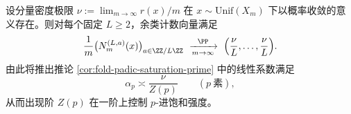\begin{conjecture}[分量余类的渐近等分布与出现阶普适律]\label{conj:fold-component-residue-equidistribution}
设分量密度极限
\(
\nu:=\lim_{m\to\infty} r(x)/m
\)
在 \(x\sim\mathrm{Unif}(X_m)\) 下以概率收敛的意义存在。则对每个固定 \(L\ge 2\)，余类计数向量满足
\[
\frac1m\bigl(N_m^{(L,a)}(x)\bigr)_{a\in\ZZ/L\ZZ}\ \xrightarrow[m\to\infty]{\PP}\ \Bigl(\frac{\nu}{L},\dots,\frac{\nu}{L}\Bigr).
\]
由此将推出推论 \ref{cor:fold-padic-saturation-prime} 中的线性系数满足
\[
\alpha_p \asymp \frac{\nu}{Z(p)}\qquad(p\ \text{素}),
\]
从而出现阶 \(Z(p)\) 在一阶上控制 \(p\)-进饱和强度。
\end{conjecture}
